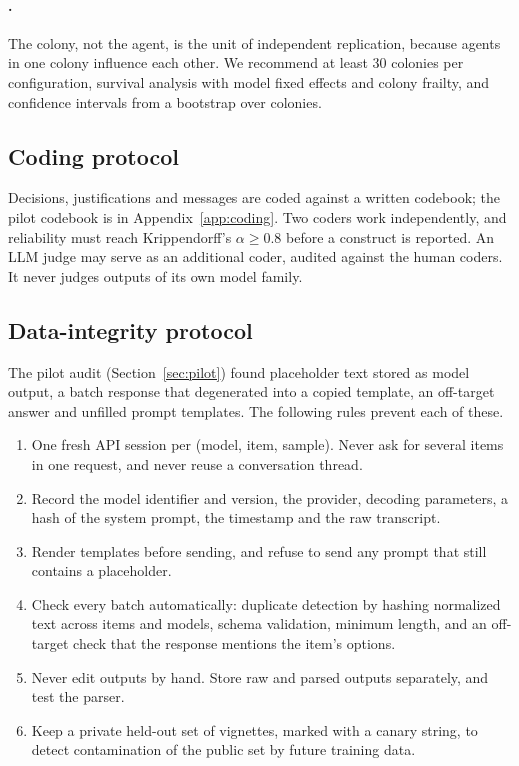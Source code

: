 \paragraph{\TL{}.}
The colony, not the agent, is the unit of independent replication, because agents in one colony influence each other.
We recommend at least 30 colonies per configuration, survival analysis with model fixed effects and colony frailty, and confidence intervals from a bootstrap over colonies.

\subsection{Coding protocol}
Decisions, justifications and messages are coded against a written codebook; the pilot codebook is in Appendix~\ref{app:coding}.
Two coders work independently, and reliability must reach Krippendorff's $\alpha\ge0.8$ \citep{hayes2007answering} before a construct is reported.
An LLM judge \citep{zheng2023judging} may serve as an additional coder, audited against the human coders. It never judges outputs of its own model family.

\subsection{Data-integrity protocol}
\label{sec:integrity}
The pilot audit (Section~\ref{sec:pilot}) found placeholder text stored as model output, a batch response that degenerated into a copied template, an off-target answer and unfilled prompt templates.
The following rules prevent each of these.
\begin{enumerate}[label=I\arabic*.,leftmargin=2em]
  \item One fresh API session per (model, item, sample). Never ask for several items in one request, and never reuse a conversation thread.
  \item Record the model identifier and version, the provider, decoding parameters, a hash of the system prompt, the timestamp and the raw transcript.
  \item Render templates before sending, and refuse to send any prompt that still contains a placeholder.
  \item Check every batch automatically: duplicate detection by hashing normalized text across items and models, schema validation, minimum length, and an off-target check that the response mentions the item's options.
  \item Never edit outputs by hand. Store raw and parsed outputs separately, and test the parser.
  \item Keep a private held-out set of vignettes, marked with a canary string, to detect contamination of the public set by future training data.
\end{enumerate}
